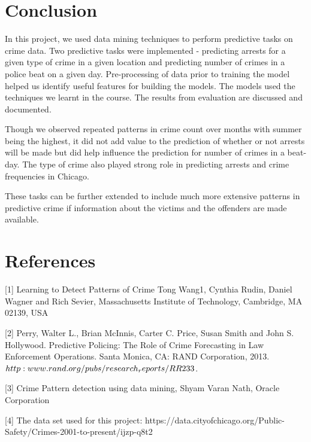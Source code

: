 \documentclass[journal]{IEEEtran}
\begin{document}
\section{Conclusion}
In this project, we used data mining techniques to perform predictive tasks on crime data. Two predictive tasks were implemented - predicting arrests for a given type of crime in a given location and predicting number of crimes in a police beat on a given day. Pre-processing of data prior to training the model helped us identify useful features for building the models. The models used the techniques we learnt in the course. The results from evaluation are discussed and documented.  

Though we observed repeated patterns in crime count over months with summer being the highest, it did not add value to the prediction of whether or not arrests will be made but did help influence the prediction for number of crimes in a beat-day. The type of crime also played strong role in predicting arrests and crime frequencies in Chicago.

These tasks can be further extended to include much more extensive patterns in predictive crime if information about the victims and the offenders are made available. 

\section{References}
[1] Learning to Detect Patterns of Crime Tong Wang1, Cynthia Rudin, Daniel Wagner and Rich Sevier, Massachusetts Institute of Technology, Cambridge, MA 02139, USA

[2] Perry, Walter L., Brian McInnis, Carter C. Price, Susan Smith and John S. Hollywood. Predictive Policing: The Role of Crime Forecasting in Law Enforcement Operations. Santa Monica, CA: RAND Corporation, 2013.  $http:\/\/www.rand.org/pubs/research_reports/RR233$.

[3] Crime Pattern detection using data mining, Shyam Varan Nath, Oracle Corporation

[4] The data set used for this project: https://data.cityofchicago.org/Public-Safety/Crimes-2001-to-present/ijzp-q8t2
\end{document}
